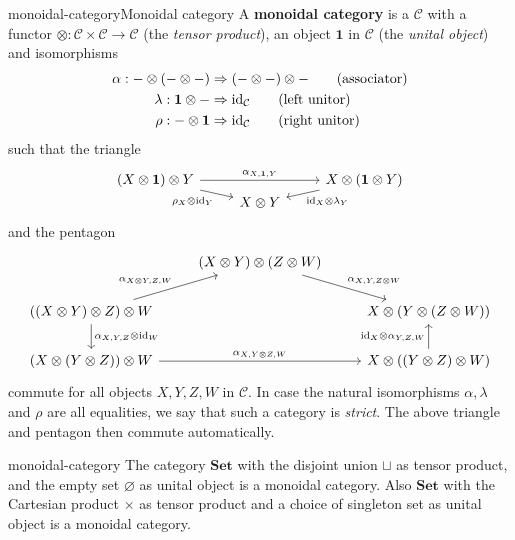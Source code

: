 \begin{topic}{monoidal-category}{Monoidal category}
    A \textbf{monoidal category} is a  $\mathcal{C}$ with a functor $\otimes : \mathcal{C} \times \mathcal{C} \to \mathcal{C}$ (the \textit{tensor product}), an object $\textbf{1}$ in $\mathcal{C}$ (the \textit{unital object}) and  isomorphisms
    \[ \begin{aligned}
        \alpha : - \otimes (- \otimes -) &\Rightarrow (- \otimes -) \otimes - \qquad \text{(associator)} \\
        \lambda : \textbf{1} \otimes - &\Rightarrow \text{id}_{\mathcal{C}} \qquad \text{(left unitor)} \\
        \rho : - \otimes \textbf{1} &\Rightarrow \text{id}_{\mathcal{C}} \qquad \text{(right unitor)}
    \end{aligned} \]
    such that the triangle
    \[ \begin{tikzcd}[row sep=0em] (X \otimes \textbf{1}) \otimes Y \arrow{rr}{\alpha_{X,\textbf{1},Y}} \arrow[swap]{rd}{\rho_X \otimes \id_Y} & & X \otimes (\textbf{1} \otimes Y) \arrow{ld}{\id_X \otimes \lambda_Y} \\ & X \otimes Y & \end{tikzcd} \]
    and the pentagon
    \[ \begin{tikzcd} & (X \otimes Y) \otimes (Z \otimes W) \arrow{rd}{\alpha_{X, Y, Z \otimes W}} & \\ ((X \otimes Y) \otimes Z) \otimes W \arrow{ur}{\alpha_{X \otimes Y, Z, W}} \arrow{d}{\alpha_{X,Y,Z} \otimes \id_W} & & X \otimes (Y \otimes (Z \otimes W)) \\ (X \otimes (Y \otimes Z)) \otimes W \arrow{rr}{\alpha_{X, Y \otimes Z, W}} & & X \otimes ((Y \otimes Z) \otimes W) \arrow{u}{\id_X \otimes \alpha_{Y, Z, W}} \end{tikzcd} \]
    commute for all objects $X, Y, Z, W$ in $\mathcal{C}$. In case the natural isomorphisms $\alpha, \lambda$ and $\rho$ are all equalities, we say that such a category is \textit{strict}. The above triangle and pentagon then commute automatically.
\end{topic}

\begin{example}{monoidal-category}
    The category $\textbf{Set}$ with the disjoint union $\sqcup$ as tensor product, and the empty set $\varnothing$ as unital object is a monoidal category. Also $\textbf{Set}$ with the Cartesian product $\times$ as tensor product and a choice of singleton set as unital object is a monoidal category.
\end{example}

